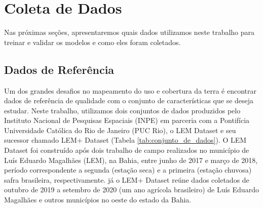 \chapter{Coleta de Dados}

Nas próximas seções, apresentaremos quais dados utilizamos neste trabalho para treinar e validar os modelos e como eles foram coletados. 
  



\section{Dados de Referência}

Um dos grandes desafios no mapeamento do uso e cobertura da terra é encontrar dados de referência de qualidade com o conjunto de características que se deseja estudar. Neste trabalho, utilizamos dois conjuntos de dados produzidos pelo Instituto Nacional de Pesquisas Espaciais (INPE) em parceria com a Pontifícia Universidade Católica do Rio de Janeiro (PUC Rio), o LEM Dataset e seu sucessor chamado LEM+ Dataset (Tabela \ref{tab:conjunto_de_dados}). O LEM Dataset foi construído após dois trabalho de campo realizados no município de Luís Eduardo Magalhães (LEM), na Bahia, entre junho de 2017 e março de 2018, período correspondente a segunda (estação seca) e a primeira (estação chuvosa) safra brasileira, respectivamente. já o LEM+ Dataset reúne dados coletados de outubro de 2019 a setembro de 2020 (um ano agrícola brasileiro) de Luís Eduardo Magalhães e outros municípios no oeste do estado da Bahia.    

